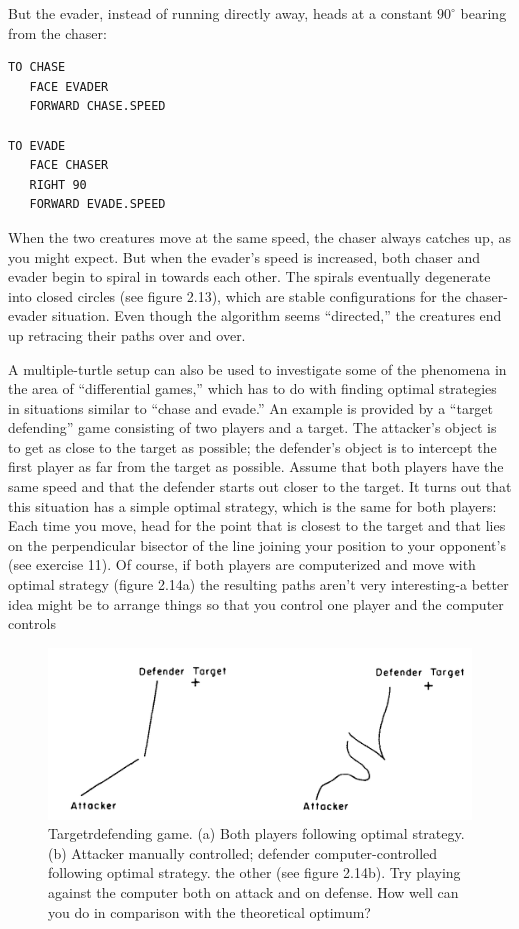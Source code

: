 \documentclass{book}
\begin{document}
But the evader, instead of running directly away, heads at a constant $90^{\circ}$ bearing from the chaser:


\begin{verbatim}
TO CHASE
   FACE EVADER
   FORWARD CHASE.SPEED

TO EVADE
   FACE CHASER
   RIGHT 90
   FORWARD EVADE.SPEED
\end{verbatim}
When the two creatures move at the same speed, the chaser always
catches up, as you might expect. But when the evader's speed is increased, both chaser and evader begin to spiral in towards each other.
The spirals eventually degenerate into closed circles (see figure 2.13),
which are stable configurations for the chaser-evader situation. Even
though the algorithm seems ``directed,'' the creatures end up retracing
their paths over and over.

A multiple-turtle setup can also be used to investigate some of the
phenomena in the area of ``differential games,'' which has to do with
finding optimal strategies in situations similar to ``chase and evade.'' An
example is provided by a ``target defending'' game consisting of two
players and a target. The attacker's object is to get as close to the
target as possible; the defender's object is to intercept the first player as
far from the target as possible. Assume that both players have the same
speed and that the defender starts out closer to the target. It turns out
that this situation has a simple optimal strategy, which is the same for
both players: Each time you move, head for the point that is closest to
the target and that lies on the perpendicular bisector of the line joining
your position to your opponent's (see exercise 11). Of course, if both
players are computerized and move with optimal strategy (figure 2.14a)
the resulting paths aren't very interesting-a better idea might be to
arrange things so that you control one player and the computer controls

\begin{figure}
\begin{center}
\includegraphics[scale=1]{fig2-14}
\caption{Targetrdefending game. (a) Both players following optimal strategy. (b) Attacker manually controlled; defender computer-controlled following optimal strategy. the other (see figure 2.14b). Try playing against the computer both on attack and on defense. How well can you do in comparison with the theoretical optimum?}
\end{center}
\end{figure}
\end{document}
